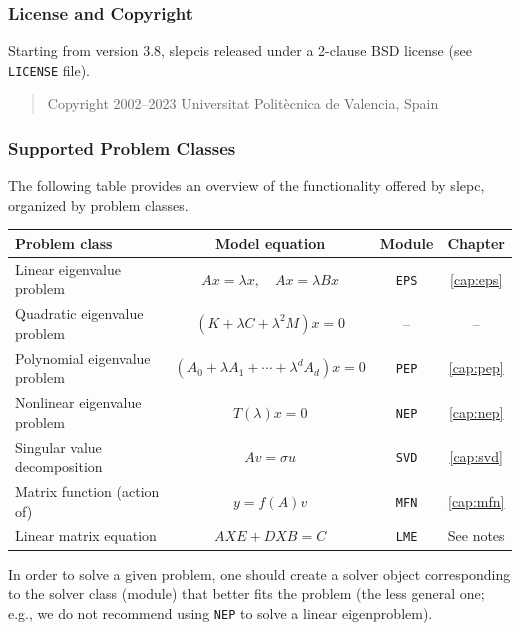 \documentclass[titlepage,10pt,a4paper]{book}
\newcommand{\packnoi}[1]{{\sc #1}\xspace}
\newcommand{\slepc}{\texorpdfstring{\packnoi{slep\rm c}}{{SLEPc}}}
\begin{document}
{\subsubsection*{License and Copyright}

Starting from version 3.8, \slepc is released under a 2-clause BSD license (see \texttt{LICENSE} file).

\begin{quote}
\begin{sffamily}
Copyright 2002--2023 Universitat Polit\`ecnica de Valencia, Spain
\end{sffamily}
\end{quote}

\newpage
\subsubsection*{Supported Problem Classes}

The following table provides an overview of the functionality offered by \slepc, organized by problem classes.

\begin{table}[h]
\label{tab:modules}
\centering
{\small \begin{tabular}{lccc}
Problem class                 & Model equation  & Module       & Chapter \\\hline
Linear eigenvalue problem     & $Ax=\lambda x,\quad Ax=\lambda Bx$ & \texttt{EPS} & \ref{cap:eps} \\
Quadratic eigenvalue problem  & $(K+\lambda C+\lambda^2M)x=0$ & -- & -- \\
Polynomial eigenvalue problem & $(A_0+\lambda A_1+\cdots+\lambda^dA_d)x=0$ & \texttt{PEP} & \ref{cap:pep} \\
Nonlinear eigenvalue problem  & $T(\lambda)x=0$ & \texttt{NEP} & \ref{cap:nep} \\\hline
Singular value decomposition  & $Av=\sigma u$   & \texttt{SVD} & \ref{cap:svd} \\
Matrix function (action of)   & $y=f(A)v$   & \texttt{MFN} & \ref{cap:mfn} \\
Linear matrix equation        & $AXE+DXB=C$   & \texttt{LME} & See notes \\\hline
\end{tabular} }
\end{table}

\noindent In order to solve a given problem, one should create a solver object corresponding to the solver class (module) that better fits the problem (the less general one; e.g., we do not recommend using \texttt{NEP} to solve a linear eigenproblem).\\[3mm]

}
\end{document}
